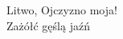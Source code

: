 \documentclass{umg-ef-thesis}
\begin{document}
Litwo, Ojczyzno moja!\\
Zażółć gęślą jaźń
\end{document}
